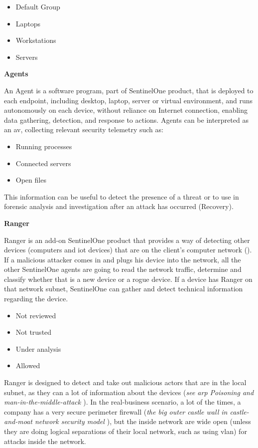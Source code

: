 \begin{itemize}
      \item Default Group
      \item Laptops
      \item Workstations
      \item Servers
\end{itemize}

\textbf{Agents}

An Agent is a software program, part of SentinelOne product, that is deployed to each endpoint, including desktop, laptop,
server or virtual environment, and runs autonomously on each device, without reliance on Internet connection, enabling data
gathering, detection, and response to actions. Agents can be interpreted as an \acrshort{av}, collecting relevant security
telemetry such as:
\begin{itemize}
      \item Running processes
      \item Connected servers
      \item Open files
\end{itemize}
This information can be useful to detect the presence of a threat or to use in forensic analysis and investigation after
an attack has occurred (Recovery).

\textbf{Ranger}

Ranger is an add-on SentinelOne product that provides a way of detecting other devices (computers and \acrshort{iot} devices) that
are on the client's computer network (\textit{\cite{ranger}}). If a malicious attacker comes in and plugs his device
into the network, all the other SentinelOne agents are going to read the network traffic, determine and classify whether
that is a new device or a rogue device. If a device has Ranger on that network subnet, SentinelOne can gather and
detect technical information regarding the device.

\begin{itemize}
      \item Not reviewed
      \item Not trusted
      \item Under analysis
      \item Allowed
\end{itemize}

Ranger is designed to detect and take out malicious actors that are in the local subnet, as they can a lot of information about the
devices (\textit{see \acrshort{arp} Poisoning \cite{arpSpoofing} and man-in-the-middle-attack \cite{man-in-the-middleAttack}}).
In the real-business scenario, a lot of the times, a company has a very secure perimeter firewall
(\textit{the big outer castle wall in castle-and-moat network security model \cite{castleMoatWallNetwork}}), but the inside network
are wide open (unless they are doing logical separations of their local network, such as using \acrshort{vlan}) for attacks inside
the network.

